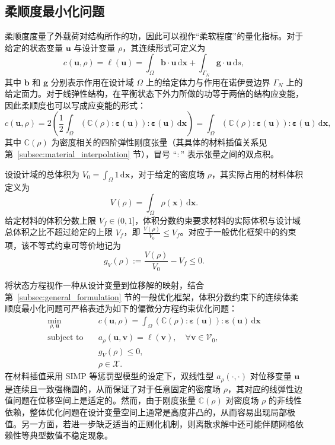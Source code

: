 \subsection{柔顺度最小化问题}
\label{subsec:min_compliance}

柔顺度度量了外载荷对结构所作的功，因此可以视作“柔软程度”的量化指标。对于给定的状态变量 $\boldsymbol{u}$ 与设计变量 $\rho$，其连续形式可定义为
\[
c(\boldsymbol{u},\rho) = \ell(\boldsymbol{u}) = \int_{\Omega}\boldsymbol{b}\cdot\boldsymbol{u}\,\mathrm{d}\boldsymbol{x} + \int_{\Gamma_N}\boldsymbol{g}\cdot\boldsymbol{u}\,\mathrm{d}s,
\]
其中 $\boldsymbol{b}$ 和 $\boldsymbol{g}$ 分别表示作用在设计域 $\Omega$ 上的给定体力与作用在诺伊曼边界 $\Gamma_N$ 上的给定面力。对于线弹性结构，在平衡状态下外力所做的功等于两倍的结构应变能，因此柔顺度也可以写成应变能的形式：
\[
c(\boldsymbol{u},\rho) = 2\left(\frac{1}{2}\int_{\Omega}(\mathbb{C}(\rho):\boldsymbol{\varepsilon}(\boldsymbol{u})):\boldsymbol{\varepsilon}(\boldsymbol{u})\,\mathrm{d}\boldsymbol{x}\right) = \int_{\Omega}(\mathbb{C}(\rho):\boldsymbol{\varepsilon}(\boldsymbol{u})):\boldsymbol{\varepsilon}(\boldsymbol{u})\,\mathrm{d}\boldsymbol{x},
\]
其中 $\mathbb{C}(\rho)$ 为密度相关的四阶弹性刚度张量（其具体的材料插值关系见第~\ref{subsec:material_interpolation} 节），冒号 “$:$” 表示张量之间的双点积。

设设计域的总体积为 $V_0 = \int_{\Omega} 1\,\mathrm{d}\boldsymbol{x}$，对于给定的密度场 $\rho$，其实际占用的材料体积定义为
\[
V(\rho) = \int_{\Omega}\rho(\boldsymbol{x})\,\mathrm{d}\boldsymbol{x}.
\]
给定材料的体积分数上限 $V_f\in(0,1]$，体积分数约束要求材料的实际体积与设计域总体积之比不超过给定的上限 $V_f$，即 $\frac{V(\rho)}{V_0} \leq V_f$。对应于一般优化框架中的约束项，该不等式约束可等价地记为
\[
g_V(\rho) := \frac{V(\rho)}{V_0} - V_f \leq 0.
\]

将状态方程视作一种从设计变量到位移解的映射，结合第~\ref{subsec:general_formulation} 节的一般优化框架，体积分数约束下的连续体柔顺度最小化问题可严格表述为如下的偏微分方程约束优化问题：
\begin{equation} \label{eq:ch6_min_compliance_problem}
	\begin{aligned}
		\min_{\rho,\boldsymbol{u}}\quad&c(\boldsymbol{u}, \rho) = \int_{\Omega}(\mathbb{C}(\rho):\boldsymbol{\varepsilon}(\boldsymbol{u})):\boldsymbol{\varepsilon}(\boldsymbol{u})\,\mathrm{d}\boldsymbol{x}\\
		\text{subject~to}\quad&a_\rho(\boldsymbol{u},\boldsymbol{v}) = \ell(\boldsymbol{v}),\quad\forall\boldsymbol{v}\in\mathcal{V}_0,\\
		&g_V(\rho) \leq 0,\\
		&\rho\in\mathcal{X}.
	\end{aligned}
\end{equation}
在材料插值采用 SIMP 等惩罚型模型的设定下，双线性型 $a_\rho(\cdot,\cdot)$ 对位移变量 $\boldsymbol{u}$ 是连续且一致强椭圆的，从而保证了对于任意固定的密度场 $\rho$，其对应的线弹性边值问题在位移空间上是适定的。然而，由于刚度张量 $\mathbb{C}(\rho)$ 对密度场 $\rho$ 的非线性依赖，整体优化问题在设计变量空间上通常是高度非凸的，从而容易出现局部极值。另一方面，若进一步缺乏适当的正则化机制，则离散求解中还可能伴随网格依赖性等典型数值不稳定现象。


